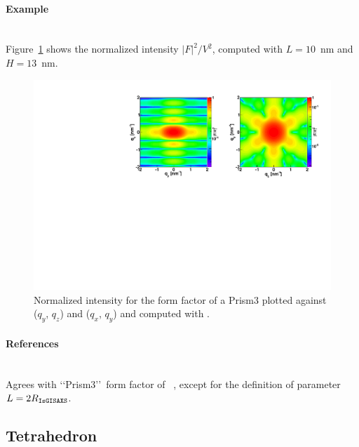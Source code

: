 \paragraph{Example}\strut\\
Figure~\ref{fig:FFprism3Ex} shows the normalized intensity
$|F|^2/V^2$, computed with $L=10$~nm and \mbox{$H=13$~nm.}
\begin{figure}[ht]
\begin{center}
\includegraphics[angle=-90,width=\textwidth]{fig/ff/figffprism3.pdf}
\end{center}
\caption{Normalized intensity for the form factor of a Prism3
 plotted against ($q_y$, $q_z$) and  ($q_x$, $q_y$) and
  computed with .}
\label{fig:FFprism3Ex}
\end{figure}

\paragraph{References}\strut\\
Agrees with \lq\lq Prism3\rq\rq\ form factor of \IsGISAXS~\cite{Laz02},
except for the definition of parameter $L= 2 R_{\rm{\texttt{IsGISAXS}}}$.

\newpage
\subsection{Tetrahedron} 
 
